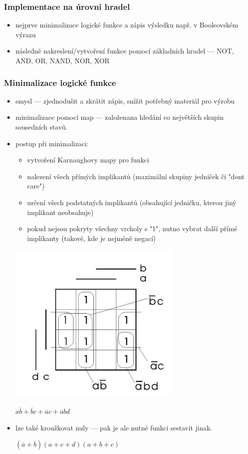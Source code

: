 \subsubsection*{Implementace na úrovni hradel}
\begin{itemize}
	\item nejprve minimalizace logické funkce a zápis výsledku např. v Booleovském výrazu
	\item následně nakreslení/vytvoření funkce pomocí základních hradel --- NOT, AND, OR, NAND, NOR, XOR
\end{itemize}

\subsubsection*{Minimalizace logické funkce}
\begin{itemize}
	\item smysl --- zjednodušit a zkrátit zápis, snížit potřebný materiál pro výrobu
	\item minimalizace pomocí map --- založenana hledání co největších skupin sousedních stavů.
	\item postup při minimalizaci:
	\begin{itemize}
		\item vytvoření Karnaughovy mapy pro funkci
		\item nalezení všech přímých implikantů (maximální skupiny jedniček či "dont care")
		\item určení všech podstatných implikantů (obsahující jedničku, kterou jiný implikant neobsahuje)
		\item pokud nejsou pokryty všechny vrcholy s "1", nutno vybrat další přímé implikanty (takové, kde je nejméně negací)
	\end{itemize}
	
	\includegraphics[width=0.4\linewidth]{img/SP-28_4.jpg}
	
	$a\overline{b}+\overline{b}c+\overline{a}c+\overline{a}bd$
	
	\item lze také kroužkovat nuly --- pak je ale nutné funkci sestavit jinak.
	
	$(\overline{a}+\overline{b})(a+c+d)(a+b+c)$
	
\end{itemize}

